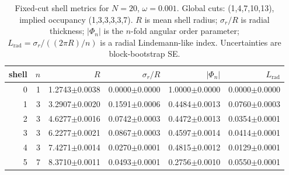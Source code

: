 \begin{table}[t]
\centering
\small
\setlength{\tabcolsep}{4pt}
\renewcommand{\arraystretch}{1.15}
\begin{tabular}{rrrrrr}
\toprule
shell & $n$ & $R$ & $\sigma_r/R$ & $|\Phi_n|$ & $L_{\mathrm{rad}}$ \\
\midrule
0 & 1 & 1.2743$\pm$0.0038 & 0.0000$\pm$0.0000 & 1.0000$\pm$0.0000 & 0.0000$\pm$0.0000 \\
1 & 3 & 3.2907$\pm$0.0020 & 0.1591$\pm$0.0006 & 0.4484$\pm$0.0013 & 0.0760$\pm$0.0003 \\
2 & 3 & 4.6277$\pm$0.0016 & 0.0742$\pm$0.0003 & 0.4472$\pm$0.0013 & 0.0354$\pm$0.0001 \\
3 & 3 & 6.2277$\pm$0.0021 & 0.0867$\pm$0.0003 & 0.4597$\pm$0.0014 & 0.0414$\pm$0.0001 \\
4 & 3 & 7.4271$\pm$0.0014 & 0.0270$\pm$0.0001 & 0.4815$\pm$0.0012 & 0.0129$\pm$0.0001 \\
5 & 7 & 8.3710$\pm$0.0011 & 0.0493$\pm$0.0001 & 0.2756$\pm$0.0010 & 0.0550$\pm$0.0001 \\
\bottomrule
\end{tabular}
\caption{Fixed-cut shell metrics for $N=20$, $\omega=0.001$. Global cuts: (1,4,7,10,13), implied occupancy (1,3,3,3,3,7). $R$ is mean shell radius; $\sigma_r/R$ is radial thickness; $|\Phi_n|$ is the $n$-fold angular order parameter; $L_{\mathrm{rad}}=\sigma_r / ((2\pi R)/n)$ is a radial Lindemann-like index. Uncertainties are block-bootstrap SE.}
\label{tab:shells_N20_omega0p001}
\end{table}
